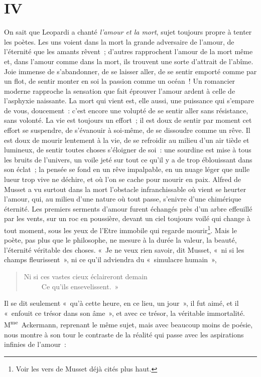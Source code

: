 \documentclass[french,twoside]{book} %
\begin{document}
\section[{IV}]{IV}
\noindent On sait que Leopardi a chanté \emph{l’amour et la mort}, sujet toujours propre à tenter les poètes. Les uns voient dans la mort la grande adversaire de l’amour, de l’éternité que les amants rêvent ; d’autres rapprochent l’amour de la mort même et, dans l’amour comme dans la mort, ils trouvent une sorte d’attrait de l’abîme. Joie immense de s’abandonner, de se laisser aller, de se sentir emporté comme par un flot, de sentir monter en soi la passion comme un océan ! Un romancier moderne rapproche la sensation que fait éprouver l’amour ardent à celle de l’asphyxie naissante. La mort qui vient est, elle aussi, une puissance qui s’empare de vous, doucement : c’est encore une volupté de se sentir aller sans résistance, sans volonté. La vie est toujours un effort ; il est doux de sentir par moment cet effort se suspendre, de s’évanouir à soi-même, de se dissoudre comme un rêve. Il est doux de mourir lentement à la vie, de se refroidir au milieu d’un air tiède et lumineux, de sentir toutes choses s’éloigner de soi : une sourdine est mise à tous les bruits de l’univers, un voile jeté sur tout ce qu’il y a de trop éblouissant dans son éclat ; la pensée se fond en un rêve impalpable, en un nuage léger que nulle lueur trop vive ne déchire, et où l’on se cache pour mourir en paix. Alfred de Musset a vu surtout dans la mort l’obstacle infranchissable où vient se heurter l’amour, qui, au milieu d’une nature où tout passe, s’enivre d’une chimérique éternité. Les premiers serments d’amour furent échangés près d’un arbre effeuillé par les vents, sur un roc en poussière, devant un ciel toujours voilé qui change à tout moment, sous les yeux de l’Etre immobile qui regarde mourir\footnote{Voir les vers de Musset déjà cités plus haut.}. Mais le poète, pas plus que le philosophe, ne mesure à la durée la valeur, la beauté, l’éternité véritable des choses. « Je ne veux rien savoir, dit Musset, « ni si les champs fleurissent », ni ce qu’il adviendra du « simulacre humain »,\par


\begin{verse}
Ni si ces vastes cieux éclaireront demain\\
     Ce qu’ils ensevelissent. »\\
\end{verse}

\noindent Il se dit seulement « qu’à cette heure, en ce lieu, un jour », il fut aimé, et il « enfouit ce trésor dans son âme », et avec ce trésor, la véritable immortalité. M\textsuperscript{me} Ackermann, reprenant le même sujet, mais avec beaucoup moins de poésie, nous montre à son tour le contraste de la réalité qui passe avec les aspirations infinies de l’amour :\par
\end{document}
